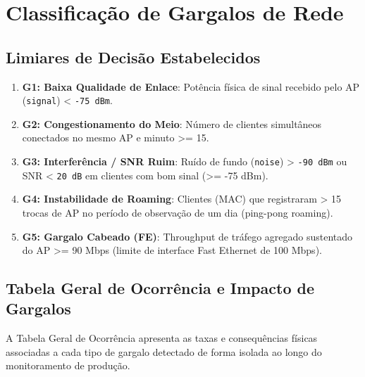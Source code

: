 \section{Classificação de Gargalos de Rede}

\subsection{Limiares de Decisão Estabelecidos}

\begin{enumerate}
  \item \textbf{G1: Baixa Qualidade de Enlace}: Potência física de sinal recebido pelo AP (\texttt{signal}) < \texttt{-75 dBm}.
  \item \textbf{G2: Congestionamento do Meio}: Número de clientes simultâneos conectados no mesmo AP e minuto >= 15.
  \item \textbf{G3: Interferência / SNR Ruim}: Ruído de fundo (\texttt{noise}) > \texttt{-90 dBm} ou SNR < \texttt{20 dB} em clientes com bom sinal (>= -75 dBm).
  \item \textbf{G4: Instabilidade de Roaming}: Clientes (MAC) que registraram > 15 trocas de AP no período de observação de um dia (ping-pong roaming).
  \item \textbf{G5: Gargalo Cabeado (FE)}: Throughput de tráfego agregado sustentado do AP >= 90 Mbps (limite de interface Fast Ethernet de 100 Mbps).


\end{enumerate}
\subsection{Tabela Geral de Ocorrência e Impacto de Gargalos}

A Tabela Geral de Ocorrência apresenta as taxas e consequências físicas associadas a cada tipo de gargalo detectado de forma isolada ao longo do monitoramento de produção.

